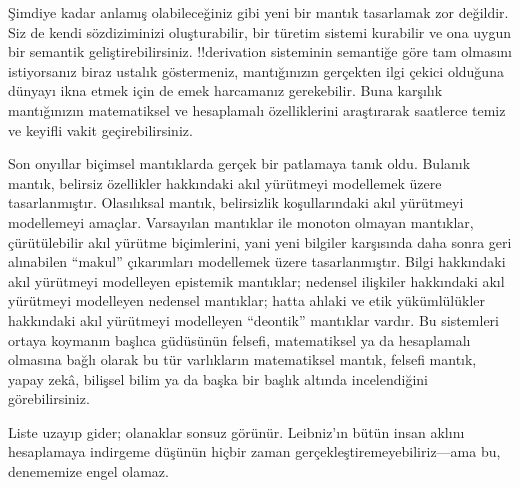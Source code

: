 



Şimdiye kadar anlamış olabileceğiniz gibi yeni bir mantık tasarlamak zor
değildir. Siz de kendi sözdiziminizi oluşturabilir, bir türetim sistemi
kurabilir ve ona uygun bir semantik geliştirebilirsiniz. !!{derivation}
sisteminin semantiğe göre tam olmasını istiyorsanız biraz ustalık göstermeniz,
mantığınızın gerçekten ilgi çekici olduğuna dünyayı ikna etmek için de emek
harcamanız gerekebilir. Buna karşılık mantığınızın matematiksel ve hesaplamalı
özelliklerini araştırarak saatlerce temiz ve keyifli vakit geçirebilirsiniz.

Son onyıllar biçimsel mantıklarda gerçek bir patlamaya tanık oldu. Bulanık
mantık, belirsiz özellikler hakkındaki akıl yürütmeyi modellemek üzere
tasarlanmıştır. Olasılıksal mantık, belirsizlik koşullarındaki akıl yürütmeyi
modellemeyi amaçlar. Varsayılan mantıklar ile monoton olmayan mantıklar,
çürütülebilir akıl yürütme biçimlerini, yani yeni bilgiler karşısında daha
sonra geri alınabilen ``makul'' çıkarımları modellemek üzere tasarlanmıştır.
Bilgi hakkındaki akıl yürütmeyi modelleyen epistemik mantıklar; nedensel
ilişkiler hakkındaki akıl yürütmeyi modelleyen nedensel mantıklar; hatta ahlaki
ve etik yükümlülükler hakkındaki akıl yürütmeyi modelleyen ``deontik''
mantıklar vardır. Bu sistemleri ortaya koymanın başlıca güdüsünün felsefi,
matematiksel ya da hesaplamalı olmasına bağlı olarak bu tür varlıkların
matematiksel mantık, felsefi mantık, yapay zekâ, bilişsel bilim ya da başka bir
başlık altında incelendiğini görebilirsiniz.

Liste uzayıp gider; olanaklar sonsuz görünür. Leibniz'ın bütün insan aklını
hesaplamaya indirgeme düşünün hiçbir zaman gerçekleştiremeyebiliriz---ama bu,
denememize engel olamaz.

